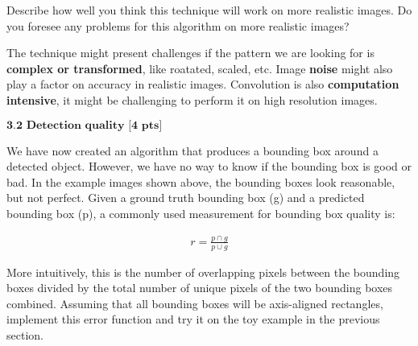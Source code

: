 \documentclass[11pt]{article}
\begin{document}
    Describe how well you think this technique will work on more realistic
images. Do you foresee any problems for this algorithm on more realistic
images?

The technique might present challenges if the pattern we are looking for
is \textbf{complex or transformed}, like roatated, scaled, etc. Image
\textbf{noise} might also play a factor on accuracy in realistic images.
Convolution is also \textbf{computation intensive}, it might be
challenging to perform it on high resolution images.

    \(\textbf{3.2 Detection quality [4 pts]}\)

We have now created an algorithm that produces a bounding box around a
detected object. However, we have no way to know if the bounding box is
good or bad. In the example images shown above, the bounding boxes look
reasonable, but not perfect. Given a ground truth bounding box (g) and a
predicted bounding box (p), a commonly used measurement for bounding box
quality is:

\begin{eqnarray}
r = \frac{p \cap g}{p \cup g}
\end{eqnarray}

More intuitively, this is the number of overlapping pixels between the
bounding boxes divided by the total number of unique pixels of the two
bounding boxes combined. Assuming that all bounding boxes will be
axis-aligned rectangles, implement this error function and try it on the
toy example in the previous section.
\end{document}
